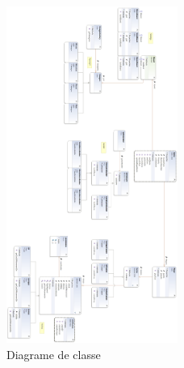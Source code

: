 	\begin{figure}
		\begin{center}
			\includegraphics[width=0.5\textwidth]{figure/entire_class_diagram}
		\end{center}
		\caption{Diagrame de classe}
		\label{fig:planif}
	\end{figure}




